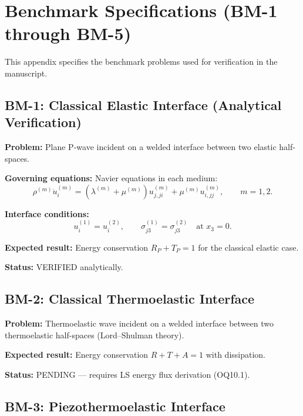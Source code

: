 \section{Benchmark Specifications (BM-1 through BM-5)}
\label{app:benchmarks}

This appendix specifies the benchmark problems used for verification in the manuscript.

\subsection{BM-1: Classical Elastic Interface (Analytical Verification)}

\textbf{Problem:} Plane P-wave incident on a welded interface between two elastic half-spaces.

\textbf{Governing equations:} Navier equations in each medium:
\begin{equation}
\rho^{(m)}\ddot{u}_i^{(m)} = (\lambda^{(m)}+\mu^{(m)})u_{j,ji}^{(m)} + \mu^{(m)}u_{i,jj}^{(m)},
\qquad m = 1,2.
\end{equation}

\textbf{Interface conditions:}
\begin{equation}
u_i^{(1)} = u_i^{(2)}, \qquad
\sigma_{j3}^{(1)} = \sigma_{j3}^{(2)} \quad \text{at } x_3 = 0.
\end{equation}

\textbf{Expected result:} Energy conservation $R_P + T_P = 1$ for the classical elastic case.

\textbf{Status:} VERIFIED analytically.

\subsection{BM-2: Classical Thermoelastic Interface}

\textbf{Problem:} Thermoelastic wave incident on a welded interface between two thermoelastic half-spaces (Lord--Shulman theory).

\textbf{Expected result:} Energy conservation $R + T + A = 1$ with dissipation.

\textbf{Status:} PENDING — requires LS energy flux derivation (OQ10.1).

\subsection{BM-3: Piezothermoelastic Interface}

